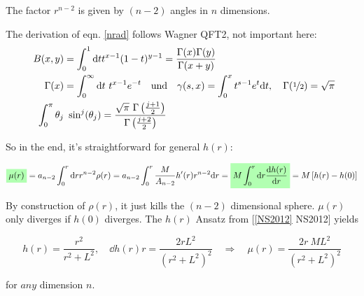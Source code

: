 \documentclass[10pt,a4paper, fleqn]{article}
\newcommand{\highlight}[1]{%
  \colorbox{green!30}{$\displaystyle#1$}}
\begin{document}
The factor $r^{n-2}$ is given by $(n-2)$ angles in $n$ dimensions.

The derivation of eqn. \ref{nrad} follows Wagner QFT2, not important here:
\begin{align}
B(x,y) &= \int_0^1 \mathrm{d} t t^{x-1} (1-t)^{y-1} = \frac{\Gamma(x)\Gamma(y)}{\Gamma(x+y)} \\
\Gamma(x) &= \int_0^\infty \mathrm{d} t ~ t^{x-1} e^{-t} \quad \text{und} \quad \gamma(s,x) = \int_0^x t^{s-1} e^{t} \mathrm{d} t, \quad \Gamma(\nicefrac{1}{2}) = \sqrt{\pi} \\
\quad \int_0^\pi \theta_j &~ \sin^j(\theta_j) = \frac{\sqrt{\pi}~ \Gamma\left(\frac{j+1}{2}\right)}{\Gamma\left(\frac{j+2}{2}\right)}
\end{align}

So in the end, it's straightforward for general $h(r)$:

\begin{equation}
\highlight{ \mu(r) } = a_{n-2} \int_0^r \d r r^{n-2} \rho(r) = a_{n-2} \int_0^r \frac{M}{A_{n-2}} h'(r) r^{n-2} \d r = \highlight{ M \int_0^r \d r \dd{h(r)}{r} } = M \left[ h(r) - h(0) \right]
\end{equation}

By construction of $\rho(r)$, it just kills the $(n-2)$ dimensional sphere. $\mu(r)$ only diverges if $h(0)$ diverges. The $h(r)$ Ansatz from [\ref{NS2012} NS2012] yields

\begin{equation}
h(r) = \frac{r^2}{r^2 + L^2}, \quad \dd{h(r)}{r} = \frac{2rL^2}{(r^2 + L^2)^2} \quad
\Rightarrow \quad \mu(r) = \frac{2r ~ML^2}{(r^2+L^2)^2}
\end{equation}

for \highlight{ any } dimension $n$.







\end{document}
